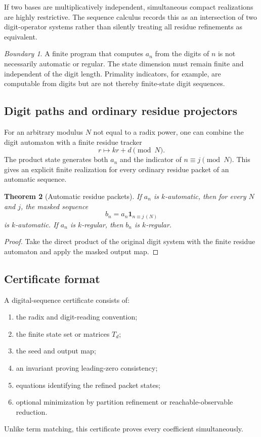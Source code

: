\documentclass[11pt]{article}
\newtheorem{theorem}{Theorem}[section]\newtheorem{proposition}[theorem]{Proposition}\newtheorem{lemma}[theorem]{Lemma}\newtheorem{corollary}[theorem]{Corollary}
\theoremstyle{definition}\newtheorem{definition}[theorem]{Definition}\newtheorem{example}[theorem]{Example}\newtheorem{construction}[theorem]{Construction}\newtheorem{algorithm}[theorem]{Algorithm}\newtheorem{conjecture}[theorem]{Conjecture}\newtheorem{problem}[theorem]{Problem}
\theoremstyle{remark}\newtheorem{remark}[theorem]{Remark}\newtheorem{boundary}[theorem]{Boundary}\newtheorem{certificate}[theorem]{Computational Certificate}\newtheorem{classical}[theorem]{Classical Input}\newtheorem{principle}[theorem]{Structural Principle}
\begin{document}
If two bases are multiplicatively independent, simultaneous compact realizations are highly restrictive.  The sequence calculus records this as an intersection of two digit-operator systems rather than silently treating all residue refinements as equivalent.

\begin{boundary}
A finite program that computes $a_n$ from the digits of $n$ is not necessarily automatic or regular.  The state dimension must remain finite and independent of the digit length.  Primality indicators, for example, are computable from digits but are not thereby finite-state digit sequences.
\end{boundary}

\subsection{Digit paths and ordinary residue projectors}
For an arbitrary modulus $N$ not equal to a radix power, one can combine the digit automaton with a finite residue tracker
\[
 r\longmapsto kr+d\pmod N.
\]
The product state generates both $a_n$ and the indicator of $n\equiv j\pmod N$.  This gives an explicit finite realization for every ordinary residue packet of an automatic sequence.

\begin{theorem}[Automatic residue packets]
If $a_n$ is $k$-automatic, then for every $N$ and $j$, the masked sequence
\[
 b_n=a_n\mathbf 1_{n\equiv j\,(N)}
\]
is $k$-automatic.  If $a_n$ is $k$-regular, then $b_n$ is $k$-regular.
\end{theorem}
\begin{proof}
Take the direct product of the original digit system with the finite residue automaton and apply the masked output map.
\end{proof}

\subsection{Certificate format}
A digital-sequence certificate consists of:
\begin{enumerate}
\item the radix and digit-reading convention;
\item the finite state set or matrices $T_d$;
\item the seed and output map;
\item an invariant proving leading-zero consistency;
\item equations identifying the refined packet states;
\item optional minimization by partition refinement or reachable-observable reduction.
\end{enumerate}
Unlike term matching, this certificate proves every coefficient simultaneously.
\end{document}
